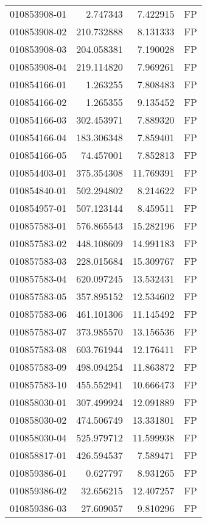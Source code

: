 \begin{tabular}{lrrl}
010853908-01 &    2.747343 &     7.422915 &   FP \\
010853908-02 &  210.732888 &     8.131333 &   FP \\
010853908-03 &  204.058381 &     7.190028 &   FP \\
010853908-04 &  219.114820 &     7.969261 &   FP \\
010854166-01 &    1.263255 &     7.808483 &   FP \\
010854166-02 &    1.265355 &     9.135452 &   FP \\
010854166-03 &  302.453971 &     7.889320 &   FP \\
010854166-04 &  183.306348 &     7.859401 &   FP \\
010854166-05 &   74.457001 &     7.852813 &   FP \\
010854403-01 &  375.354308 &    11.769391 &   FP \\
010854840-01 &  502.294802 &     8.214622 &   FP \\
010854957-01 &  507.123144 &     8.459511 &   FP \\
010857583-01 &  576.865543 &    15.282196 &   FP \\
010857583-02 &  448.108609 &    14.991183 &   FP \\
010857583-03 &  228.015684 &    15.309767 &   FP \\
010857583-04 &  620.097245 &    13.532431 &   FP \\
010857583-05 &  357.895152 &    12.534602 &   FP \\
010857583-06 &  461.101306 &    11.145492 &   FP \\
010857583-07 &  373.985570 &    13.156536 &   FP \\
010857583-08 &  603.761944 &    12.176411 &   FP \\
010857583-09 &  498.094254 &    11.863872 &   FP \\
010857583-10 &  455.552941 &    10.666473 &   FP \\
010858030-01 &  307.499924 &    12.091889 &   FP \\
010858030-02 &  474.506749 &    13.331801 &   FP \\
010858030-04 &  525.979712 &    11.599938 &   FP \\
010858817-01 &  426.594537 &     7.589471 &   FP \\
010859386-01 &    0.627797 &     8.931265 &   FP \\
010859386-02 &   32.656215 &    12.407257 &   FP \\
010859386-03 &   27.609057 &     9.810296 &   FP \\

\end{tabular}
